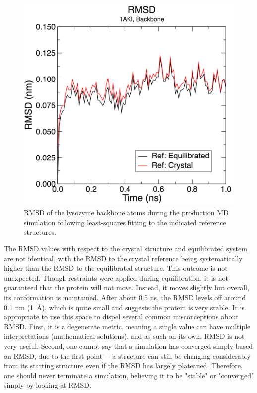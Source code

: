 \documentclass[9pt,tutorial,pubversion]{livecoms}
\begin{document}
\begin{figure}[h]
\centering
\includegraphics{plot_lyso_md_rmsd}
\caption{RMSD of the lysozyme backbone atoms during the production MD simulation following least-squares fitting to the indicated reference structures.}
\label{lyso_md_rmsd_fig}
\end{figure}

The RMSD values with respect to the crystal structure and equilibrated system are not identical, with the RMSD to the crystal reference being systematically higher than the RMSD to the equilibrated structure. This outcome is not unexpected. Though restraints were applied during equilibration, it is not guaranteed that the protein will not move. Instead, it moves slightly but overall, its conformation is maintained. After about 0.5 ns, the RMSD levels off around 0.1 nm (1~\AA), which is quite small and suggests the protein is very stable. It is appropriate to use this space to dispel several common misconceptions about RMSD. First, it is a degenerate metric, meaning a single value can have multiple interpretations (mathematical solutions), and as such on its own, RMSD is not very useful. Second, one cannot say that a simulation has converged simply based on RMSD, due to the first point $-$ a structure can still be changing considerably from its starting structure even if the RMSD has largely plateaued. Therefore, one should never terminate a simulation, believing it to be "stable" or "converged" simply by looking at RMSD.
\end{document}
